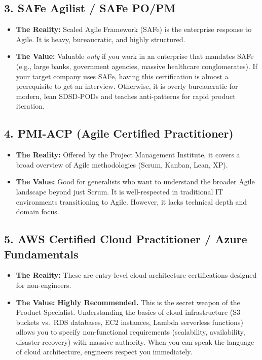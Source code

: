 \documentclass[
  11pt,
  openany,
  oneside]{book}
\providecommand{\tightlist}{%
  \setlength{\itemsep}{0pt}\setlength{\parskip}{0pt}}
\begin{document}
\subsection{3. SAFe Agilist / SAFe PO/PM}\label{safe-agilist-safe-popm}

\begin{itemize}
\tightlist
\item
  \textbf{The Reality:} Scaled Agile Framework (SAFe) is the enterprise
  response to Agile. It is heavy, bureaucratic, and highly structured.
\item
  \textbf{The Value:} Valuable \emph{only} if you work in an enterprise
  that mandates SAFe (e.g., large banks, government agencies, massive
  healthcare conglomerates). If your target company uses SAFe, having
  this certification is almost a prerequisite to get an interview.
  Otherwise, it is overly bureaucratic for modern, lean SDSD-PODs and
  teaches anti-patterns for rapid product iteration.
\end{itemize}

\subsection{4. PMI-ACP (Agile Certified
Practitioner)}\label{pmi-acp-agile-certified-practitioner}

\begin{itemize}
\tightlist
\item
  \textbf{The Reality:} Offered by the Project Management Institute, it
  covers a broad overview of Agile methodologies (Scrum, Kanban, Lean,
  XP).
\item
  \textbf{The Value:} Good for generalists who want to understand the
  broader Agile landscape beyond just Scrum. It is well-respected in
  traditional IT environments transitioning to Agile. However, it lacks
  technical depth and domain focus.
\end{itemize}

\subsection{5. AWS Certified Cloud Practitioner / Azure
Fundamentals}\label{aws-certified-cloud-practitioner-azure-fundamentals}

\begin{itemize}
\tightlist
\item
  \textbf{The Reality:} These are entry-level cloud architecture
  certifications designed for non-engineers.
\item
  \textbf{The Value:} \textbf{Highly Recommended.} This is the secret
  weapon of the Product Specialist. Understanding the basics of cloud
  infrastructure (S3 buckets vs.~RDS databases, EC2 instances, Lambda
  serverless functions) allows you to specify non-functional
  requirements (scalability, availability, disaster recovery) with
  massive authority. When you can speak the language of cloud
  architecture, engineers respect you immediately.
\end{itemize}
\end{document}
